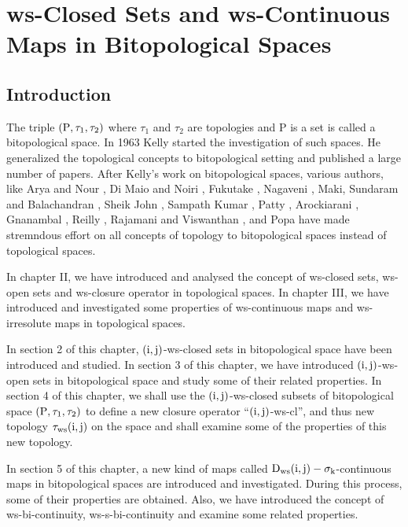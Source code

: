 \chapter{ws-Closed Sets and ws-Continuous Maps in Bitopological Spaces}
\graphicspath{{Chapter7/Chapter7Figs/EPS/}{Chapter7/Chapter7Figs/}}

\section{Introduction}\label{sec7.1}

The triple $(\mathrm{P}, \tau_1, \tau_2)$ where $\tau_1$ and $\tau_2$ are topologies and P is a set is called a bitopological space. In 1963 Kelly \cite{key45} started the investigation of such spaces. He generalized the topological concepts to bitopological setting and published a large number of papers. After Kelly’s work on bitopological spaces, various authors, like Arya and Nour \cite{key7}, Di Maio and Noiri \cite{key24}, Fukutake \cite{key34}, Nagaveni \cite{key65}, Maki, Sundaram and Balachandran \cite{key55}, Sheik John \cite{key85}, Sampath Kumar \cite{key82}, Patty \cite{key77}, Arockiarani \cite{key3}, Gnanambal \cite{key40}, Reilly \cite{key8}, Rajamani and Viswanthan \cite{key80}, and Popa \cite{key78} have made stremndous effort on all concepts of topology to bitopological spaces instead of topological spaces.

In chapter II, we have introduced and analysed the concept of ws-closed sets, ws-open sets and ws-closure operator in topological spaces. In chapter III, we have introduced and investigated some properties of ws-continuous maps and ws-irresolute maps in topological spaces.

In section 2 of this chapter, $(\mathrm{i},\mathrm{j})$-ws-closed sets in bitopological space have been introduced and studied. In section 3 of this chapter, we have introduced $(\mathrm{i}, \mathrm{j})$-ws-open sets in bitopological space and study some of their related properties. In section 4 of this chapter, we shall use the $(\mathrm{i}, \mathrm{j})$-ws-closed subsets of bitopological space $(\mathrm{P}, \tau_1, \tau_2)$ to define a new closure operator ``$(\mathrm{i}, \mathrm{j})$-ws-cl'', and thus new topology $\tau_{\mathrm{ws}}(\mathrm{i}, \mathrm{j})$ on the space and shall examine some of the properties of this new topology.

In section 5 of this chapter, a new kind of maps called $\mathrm{D}_{\mathrm{ws}} (\mathrm{i}, \mathrm{j})-\sigma_{\mathrm{k}}$-continuous maps in bitopological spaces are introduced and investigated. During this process, some of their properties are obtained. Also, we have introduced the concept of ws-bi-continuity, ws-s-bi-continuity and examine some related properties.

